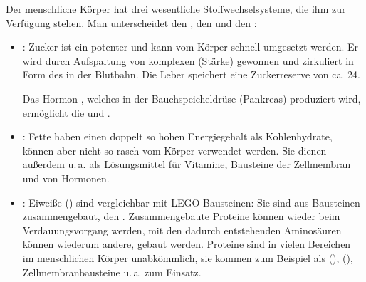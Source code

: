 {%
 Der menschliche Körper hat drei wesentliche
Stoffwechselsysteme, die ihm zur Verfügung stehen. Man
unterscheidet den ,
den  und den :
\begin{itemize}
  \item {}: Zucker ist ein potenter
   und kann vom Körper schnell umgesetzt werden. Er wird durch
  Aufspaltung von komplexen  (Stärke)
  gewonnen und zirkuliert in Form des  in der
  Blutbahn. Die Leber speichert eine Zuckerreserve von ca.
  24\Hour*.
  
  Das Hormon \label{topic:insulin}, welches in der
  Bauchspeicheldrüse (Pankreas) produziert wird,  ermöglicht
  die  und .
  \item {}: Fette haben einen doppelt so
  hohen Energiegehalt als Kohlenhydrate, können aber nicht so
  rasch vom Körper verwendet werden. Sie dienen außerdem
  u.\,a. als Lösungsmittel für Vitamine, Bausteine der
  Zellmembran und von Hormonen. 
  \item {}: Eiweiße ()
  sind vergleichbar mit LEGO{\texttrademark}-Bausteinen: Sie
  sind aus Bausteinen zusammengebaut, den .
  Zusammengebaute Proteine können wieder beim
  Verdauungsvorgang  werden, mit den
  dadurch entstehenden Aminosäuren können wiederum andere,
   gebaut werden. Proteine sind in vielen
  Bereichen im menschlichen Körper unabkömmlich, sie kommen
  zum Beispiel als 
  (), 
  (), Zellmembranbausteine
  u.\,a. zum Einsatz.
\end{itemize}


}
